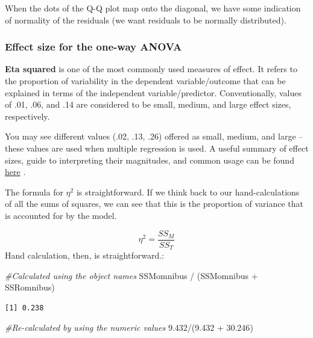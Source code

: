 \documentclass[
  11pt,
]{book}
\newenvironment{Shaded}{\begin{snugshade}}{\end{snugshade}}
\newcommand{\CommentTok}[1]{\textcolor[rgb]{0.56,0.35,0.01}{\textit{#1}}}
\newcommand{\FloatTok}[1]{\textcolor[rgb]{0.00,0.00,0.81}{#1}}
\newcommand{\NormalTok}[1]{#1}
\newcommand{\SpecialCharTok}[1]{\textcolor[rgb]{0.00,0.00,0.00}{#1}}
\begin{document}
When the dots of the Q-Q plot map onto the diagonal, we have some indication of normality of the residuals (we want residuals to be normally distributed).

\hypertarget{effect-size-for-the-one-way-anova}{%
\subsubsection{Effect size for the one-way ANOVA}\label{effect-size-for-the-one-way-anova}}

\textbf{Eta squared} is one of the most commonly used measures of effect. It refers to the proportion of variability in the dependent variable/outcome that can be explained in terms of the independent variable/predictor. Conventionally, values of .01, .06, and .14 are considered to be small, medium, and large effect sizes, respectively.

You may see different values (.02, .13, .26) offered as small, medium, and large -- these values are used when multiple regression is used. A useful summary of effect sizes, guide to interpreting their magnitudes, and common usage can be found \href{https://imaging.mrc-cbu.cam.ac.uk/statswiki/FAQ/effectSize}{here} \citep{watson_rules_2020}.

The formula for \(\eta^2\) is straightforward. If we think back to our hand-calculations of all the sums of squares, we can see that this is the proportion of variance that is accounted for by the model.

\[\eta ^{2}=\frac{SS_{M}}{SS_{T}}\]
Hand calculation, then, is straightforward.:

\begin{Shaded}
\begin{Highlighting}[]
\CommentTok{\#Calculated using the object names}
\NormalTok{SSMomnibus }\SpecialCharTok{/}\NormalTok{ (SSMomnibus }\SpecialCharTok{+}\NormalTok{ SSRomnibus)}
\end{Highlighting}
\end{Shaded}

\begin{verbatim}
[1] 0.238
\end{verbatim}

\begin{Shaded}
\begin{Highlighting}[]
\CommentTok{\#Re{-}calculated by using the numeric values}
\FloatTok{9.432}\SpecialCharTok{/}\NormalTok{(}\FloatTok{9.432} \SpecialCharTok{+} \FloatTok{30.246}\NormalTok{)}
\end{Highlighting}
\end{Shaded}
\end{document}
